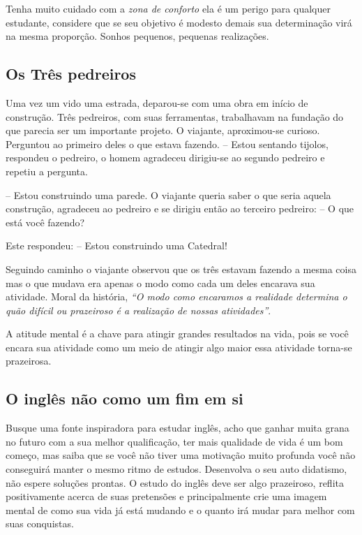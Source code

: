 \noindent
Tenha muito cuidado com a \emph{zona de conforto} ela é um perigo para
qualquer estudante, considere que se seu objetivo é modesto demais
sua determinação virá na mesma proporção. Sonhos pequenos, pequenas
realizações.

\subsection{Os Três pedreiros}
\label{sub:os_tr_s_pedreiros}

Uma vez um vido uma estrada, deparou-se com uma obra
em início de construção. Três pedreiros, com suas ferramentas,
trabalhavam na fundação do que parecia ser um importante projeto. O
viajante, aproximou-se curioso. Perguntou ao primeiro deles o que
estava fazendo. -- Estou sentando tijolos, respondeu
o pedreiro, o homem agradeceu dirigiu-se ao segundo pedreiro e repetiu a
pergunta.

\noindent
-- Estou construindo uma parede.  O viajante queria saber o que seria
aquela construção, agradeceu ao pedreiro e se dirigiu então ao
terceiro pedreiro: -- O que está você fazendo?

\noindent
Este respondeu: -- Estou construindo uma Catedral!

\noindent
Seguindo caminho o viajante observou que os três estavam
fazendo a mesma coisa mas o que mudava era apenas o modo
como cada um deles encarava sua atividade. Moral da história,
\emph{``O modo como encaramos a realidade determina o quão difícil ou
prazeiroso é a realização de nossas atividades''}.

\vspace{0.3\baselineskip}
\noindent
{\footnotesize {} A atitude mental é a chave para atingir
grandes resultados na vida, pois se você encara sua atividade
como um meio de atingir algo maior essa atividade torna-se prazeirosa.}


\subsection{O inglês não como um fim em si}
\label{sub:o_ingl_s_n_o_como_um_fim_em_si}

\noindent
Busque uma fonte inspiradora para estudar inglês, acho que ganhar muita grana
no futuro com a sua melhor qualificação, ter mais qualidade de vida é um bom
começo, mas saiba que se você não tiver uma motivação muito profunda você não
conseguirá manter o mesmo ritmo de estudos. Desenvolva o seu auto didatismo,
não espere soluções prontas. O estudo do inglês deve ser algo prazeiroso,
reflita positivamente acerca de suas pretensões e principalmente crie uma imagem
mental de como sua vida já está mudando e o quanto irá mudar para melhor com
suas conquistas.

